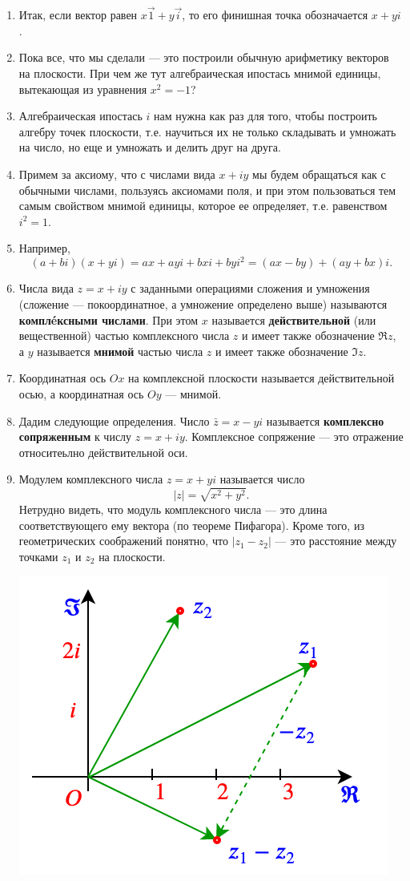 \begin{enumerate}
\item Итак, если вектор равен $x\vec 1+y\vec i$, то его финишная точка обозначается $x+yi$.
\item Пока все, что мы сделали --- это построили обычную арифметику векторов на плоскости. При чем же тут алгебраическая ипостась мнимой единицы, вытекающая из уравнения $x^2=-1$?
\item Алгебраическая ипостась $i$ нам нужна как раз для того, чтобы построить алгебру точек плоскости, т.е. научиться их не только складывать и умножать на число, но еще и умножать и делить друг на друга.
\item Примем за аксиому, что с числами вида $x+iy$ мы будем обращаться как с обычными числами, пользуясь аксиомами поля, и при этом пользоваться тем самым свойством мнимой единицы, которое ее определяет, т.е. равенством $i^2=1$.
\item Например,
$$
(a+bi)(x+yi) = ax + ayi + bxi + byi^2 = (ax-by) + (ay+bx)i.
$$
\item Числа вида $z=x+iy$ с заданными операциями сложения и умножения (сложение --- покоординатное, а умножение определено выше) называются \textbf{компл\'eксными числами}. При этом $x$ называется \textbf{действительной} (или вещественной) частью комплексного числа $z$ и имеет также обозначение $\Re z$, а $y$ называется \textbf{мнимой} частью числа $z$ и имеет также обозначение $\Im z$.
\item Координатная ось $Ox$ на комплексной плоскости называется действительной осью, а координатная ось $Oy$ --- мнимой.
\item Дадим следующие определения. Число $\bar z=x-yi$ называется \textbf{комплексно сопряженным} к числу $z=x+iy$. Комплексное сопряжение --- это отражение относитеьлно действительной оси.
\item Модулем комплексного числа $z=x+yi$ называется число $$|z|=\sqrt{x^2+y^2}.$$
Нетрудно видеть, что модуль комплексного числа --- это длина соответствующего ему вектора (по теореме Пифагора). Кроме того, из геометрических соображений понятно, что $|z_1-z_2|$ --- это расстояние между точками $z_1$ и $z_2$ на плоскости.
\begin{center}
\includegraphics[scale=0.5]{rho.png}

\end{center}
\end{enumerate}
